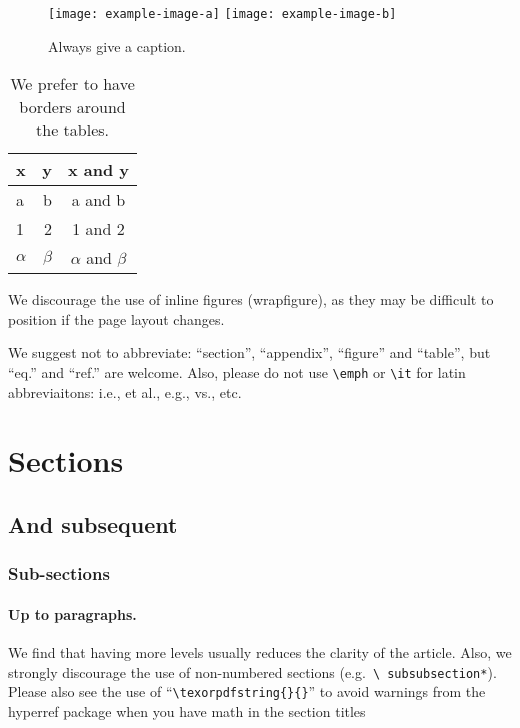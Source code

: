 \documentclass[a4paper,11pt]{article}
\begin{document}
\begin{figure}[htbp]
\centering %
\texttt{[image: example-image-a]}
\qquad
\texttt{[image: example-image-b]}
\caption{\label{fig:i} Always give a caption.}
\end{figure}


\begin{table}[htbp]
\centering
\caption{\label{tab:i} We prefer to have borders around the tables.}
\smallskip
\begin{tabular}{|lr|c|}
\hline
x&y&x and y\\
\hline
a & b & a and b\\
1 & 2 & 1 and 2\\
$\alpha$ & $\beta$ & $\alpha$ and $\beta$\\
\hline
\end{tabular}
\end{table}

We discourage the use of inline figures (wrapfigure), as they may be
difficult to position if the page layout changes.

We suggest not to abbreviate: ``section'', ``appendix'', ``figure''
and ``table'', but ``eq.'' and ``ref.'' are welcome. Also, please do
not use \texttt{\textbackslash emph} or \texttt{\textbackslash it} for
latin abbreviaitons: i.e., et al., e.g., vs., etc.



\section{Sections}
\subsection{And subsequent}
\subsubsection{Sub-sections}
\paragraph{Up to paragraphs.} We find that having more levels usually
reduces the clarity of the article. Also, we strongly discourage the
use of non-numbered sections (e.g.~\texttt{\textbackslash
  subsubsection*}).  Please also see the use of
``\texttt{\textbackslash texorpdfstring\{\}\{\}}'' to avoid warnings
from the hyperref package when you have math in the section titles
\end{document}
